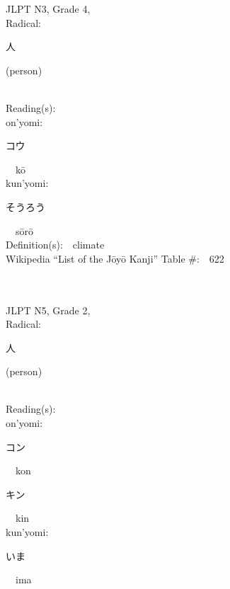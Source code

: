 \begin{multicols}{2}
{JLPT N3, Grade 4, \\Radical:\ \ {\begin{CJK}{UTF8}{min} 人 \end{CJK}} (person) } \\
Reading(s):\ \ \\
{\hspace*{1em}}on'yomi:\ \ \\
{\hspace*{2em}}{\begin{CJK}{UTF8}{min} コウ \end{CJK}}\ \ k\=o\ \ \\
{\hspace*{1em}}kun'yomi:\ \ \\
{\hspace*{2em}}{\begin{CJK}{UTF8}{min} そうろう \end{CJK}}\ \ s\=or\=o\ \ \\
Definition(s):\ \ climate \\
Wikipedia ``List of the J\=oy\=o Kanji'' Table \#:\ \ 622 \\
\ \ \\
{\fontsize{34pt}{40pt}  }\ \ \\  %
{JLPT N5, Grade 2, \\Radical:\ \ {\begin{CJK}{UTF8}{min} 人 \end{CJK}} (person) } \\
Reading(s):\ \ \\
{\hspace*{1em}}on'yomi:\ \ \\
{\hspace*{2em}}{\begin{CJK}{UTF8}{min} コン \end{CJK}}\ \ kon\ \ \\
{\hspace*{2em}}{\begin{CJK}{UTF8}{min} キン \end{CJK}}\ \ kin\ \ \\
{\hspace*{1em}}kun'yomi:\ \ \\
{\hspace*{2em}}{\begin{CJK}{UTF8}{min} いま \end{CJK}}\ \ ima\ \ \\

\end{multicols}
